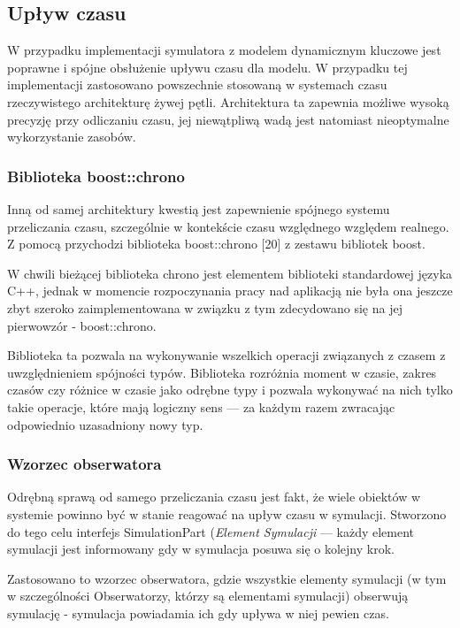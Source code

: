 {\subsection{Upływ czasu}
\par{
W przypadku implementacji symulatora z modelem dynamicznym kluczowe jest poprawne i spójne obsłużenie upływu czasu dla modelu. W przypadku tej implementacji zastosowano powszechnie stosowaną w systemach czasu rzeczywistego architekturę żywej pętli. Architektura ta zapewnia możliwe wysoką precyzję przy odliczaniu czasu, jej niewątpliwą wadą jest natomiast nieoptymalne wykorzystanie zasobów.
}
\subsubsection{Biblioteka boost::chrono}
\par{
Inną od samej architektury kwestią jest zapewnienie spójnego systemu przeliczania czasu, szczególnie w kontekście czasu względnego względem realnego. Z pomocą przychodzi biblioteka boost::chrono [20] z zestawu bibliotek boost.
\par{
W chwili bieżącej biblioteka chrono jest elementem biblioteki standardowej języka C++, jednak w momencie rozpoczynania pracy nad aplikacją nie była ona jeszcze zbyt szeroko zaimplementowana w związku z tym zdecydowano się na jej pierwowzór - boost::chrono.
}
\par{
Biblioteka ta pozwala na wykonywanie wszelkich operacji związanych z czasem z uwzględnieniem spójności typów. Biblioteka rozróżnia moment w czasie, zakres czasów czy różnice w czasie jako odrębne typy i pozwala wykonywać na nich tylko takie operacje, które mają logiczny sens --- za każdym razem zwracając odpowiednio uzasadniony nowy typ.
}
\subsubsection{Wzorzec obserwatora}
\par{
Odrębną sprawą od samego przeliczania czasu jest fakt, że wiele obiektów w systemie powinno być w stanie reagować na upływ czasu w symulacji. Stworzono do tego celu interfejs SimulationPart (\textit{Element Symulacji} --- każdy element symulacji jest informowany gdy w symulacja posuwa się o kolejny krok.
}
\par{
Zastosowano to wzorzec obserwatora, gdzie wszystkie elementy symulacji (w tym w szczególności Obserwatorzy, którzy są elementami symulacji) obserwują symulację - symulacja powiadamia ich gdy upływa w niej pewien czas.
}

}}
